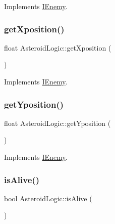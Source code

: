 Implements \hyperlink{class_i_enemy_ab1fb8f6320916ef6a1497f9651704d05}{I\+Enemy}.

\mbox{\label{class_asteroid_logic_a1d79a614c5e1a9409404f6a2def25761}} 
\subsubsection{\texorpdfstring{get\+Xposition()}{getXposition()}}
{\footnotesize\ttfamily float Asteroid\+Logic\+::get\+Xposition (\begin{DoxyParamCaption}{ }\end{DoxyParamCaption})\hspace{0.3cm}{\ttfamily [virtual]}}



Implements \hyperlink{class_i_enemy_a504ea7fa77b8984d5b9dd71352876943}{I\+Enemy}.

\mbox{\label{class_asteroid_logic_a83863c5262a29b2999d04ad443622bbc}} 
\subsubsection{\texorpdfstring{get\+Yposition()}{getYposition()}}
{\footnotesize\ttfamily float Asteroid\+Logic\+::get\+Yposition (\begin{DoxyParamCaption}{ }\end{DoxyParamCaption})\hspace{0.3cm}{\ttfamily [virtual]}}



Implements \hyperlink{class_i_enemy_a8011be7f510f6630250f8b9529815773}{I\+Enemy}.

\mbox{\label{class_asteroid_logic_a18e01f832db4f109799fc01c8c15efcd}} 
\subsubsection{\texorpdfstring{is\+Alive()}{isAlive()}}
{\footnotesize\ttfamily bool Asteroid\+Logic\+::is\+Alive (\begin{DoxyParamCaption}{ }\end{DoxyParamCaption})\hspace{0.3cm}{\ttfamily [virtual]}}



